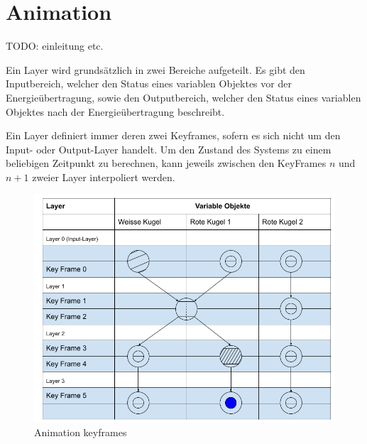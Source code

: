 \section{Animation}

TODO: einleitung etc.

Ein Layer wird grundsätzlich in zwei Bereiche aufgeteilt. Es gibt den Inputbereich, welcher den
Status eines variablen Objektes vor der Energieübertragung, sowie den Outputbereich, welcher den Status
eines variablen Objektes nach der Energieübertragung beschreibt.

Ein Layer definiert immer deren zwei Keyframes, sofern es sich nicht um den Input- oder Output-Layer handelt.
Um den Zustand des Systems zu einem beliebigen Zeitpunkt zu berechnen, kann
jeweils zwischen den KeyFrames $n$ und $n + 1$ zweier Layer interpoliert werden.

\begin{figure}[h!]
    \begin{center}
        \includegraphics[width=0.5\linewidth]{../common/03_billiard_ai/resources/18_animation_keyframes.png}
    \end{center}
    \caption{Animation keyframes}
    \label{fig:animation_keyframes_example}
\end{figure}
